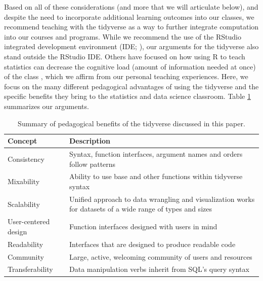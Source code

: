 \documentclass[12pt]{article}
\begin{document}
Based on all of these considerations (and more that we will articulate
below), and despite the need to incorporate additional learning outcomes
into our classes, we recommend teaching with the tidyverse as a way to
further integrate computation into our courses and programs. While we
recommend the use of the RStudio integrated development environment
(IDE; \citet{rstudio}), our arguments for the tidyverse also stand
outside the RStudio IDE. Others have focused on how using R to teach
statistics can decrease the cognitive load (amount of information needed
at once) of the class
\citep{Pruim2017, guzman2019successful, tuckerstatistics2021}, which we
affirm from our personal teaching experiences. Here, we focus on the
many different pedagogical advantages of using the tidyverse and the
specific benefits they bring to the statistics and data science
classroom. Table \ref{tab:summary} summarizes our arguments.

\linespread{1}
\begin{table}

\caption{\label{tab:tab:summary}Summary of pedagogical benefits of the tidyverse discussed in this paper.\label{tab:summary}}
\centering
\begin{tabular}[t]{l>{\raggedright\arraybackslash}p{28em}}
\toprule
\textbf{Concept} & \textbf{Description}\\
\midrule
Consistency & Syntax, function interfaces, argument names and orders follow patterns\\
\addlinespace
Mixability & Ability to use base and other functions within tidyverse syntax\\
\addlinespace
Scalability & Unified approach to data wrangling and visualization works for datasets of a wide range of types and sizes\\
\addlinespace
User-centered design & Function interfaces designed with users in mind\\
\addlinespace
Readability & Interfaces that are designed to produce readable code\\
\addlinespace
Community & Large, active, welcoming community of users and resources\\
\addlinespace
Transferability & Data manipulation verbs inherit from SQL's query syntax\\
\bottomrule
\end{tabular}
\end{table}\linespread{2}
\vspace{3mm}\setlength{\parindent}{15pt}
\end{document}
